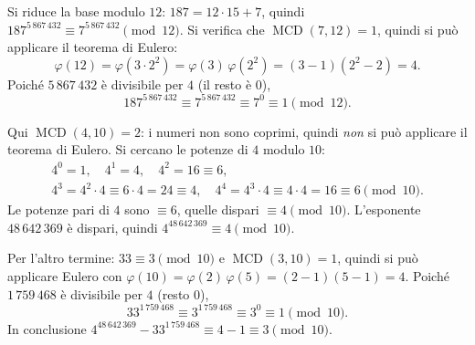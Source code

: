 \documentclass[11pt,a4paper]{article}
\begin{document}
\begin{esempio}[$187^{5\,867\,432} \bmod 12$]
Si riduce la base modulo $12$: $187 = 12\cdot 15 + 7$, quindi $187^{5\,867\,432} \equiv 7^{5\,867\,432} \pmod{12}$. Si verifica che $\operatorname{MCD}(7, 12) = 1$, quindi si può applicare il teorema di Eulero:
\[
  \varphi(12) = \varphi(3\cdot 2^2) = \varphi(3)\,\varphi(2^2) = (3 - 1)(2^2 - 2) = 4 .
\]
Poiché $5\,867\,432$ è divisibile per $4$ (il resto è $0$), 
\[
  187^{5\,867\,432} \equiv 7^{5\,867\,432} \equiv 7^0 \equiv 1 \pmod{12} .
\]
\end{esempio}

\begin{esempio}[$4^{48\,642\,369} - 33^{1\,759\,468} \bmod 10$]
Qui $\operatorname{MCD}(4, 10) = 2$: i numeri non sono coprimi, quindi \emph{non} si può applicare il teorema di Eulero. Si cercano le potenze di $4$ modulo $10$:
\[
  \begin{gathered}
  4^0 = 1,\quad 4^1 = 4,\quad 4^2 = 16 \equiv 6,\\
  4^3 = 4^2\cdot 4 \equiv 6\cdot 4 = 24 \equiv 4,\quad 4^4 = 4^3\cdot 4 \equiv 4\cdot 4 = 16 \equiv 6 \pmod{10}.
  \end{gathered}
\]
Le potenze pari di $4$ sono $\equiv 6$, quelle dispari $\equiv 4 \pmod{10}$. L'esponente $48\,642\,369$ è dispari, quindi $4^{48\,642\,369} \equiv 4 \pmod{10}$.

Per l'altro termine: $33 \equiv 3 \pmod{10}$ e $\operatorname{MCD}(3, 10) = 1$, quindi si può applicare Eulero con $\varphi(10) = \varphi(2)\,\varphi(5) = (2 - 1)(5 - 1) = 4$. Poiché $1\,759\,468$ è divisibile per $4$ (resto $0$),
\[
  33^{1\,759\,468} \equiv 3^{1\,759\,468} \equiv 3^0 \equiv 1 \pmod{10}.
\]
In conclusione $4^{48\,642\,369} - 33^{1\,759\,468} \equiv 4 - 1 \equiv 3 \pmod{10}$.
\end{esempio}
\end{document}
